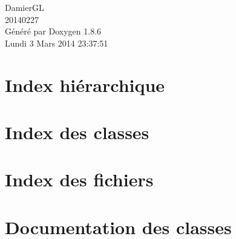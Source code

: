\documentclass[twoside]{book}
\newcommand{\clearemptydoublepage}{%
  \newpage{\pagestyle{empty}\cleardoublepage}%
}
\begin{document}
\hypersetup{pageanchor=false}
\begin{titlepage}
\vspace*{7cm}
\begin{center}%
{\Large Damier\-G\-L \\[1ex]\large 20140227 }\\
\vspace*{1cm}
{\large Généré par Doxygen 1.8.6}\\
\vspace*{0.5cm}
{\small Lundi 3 Mars 2014 23:37:51}\\
\end{center}
\end{titlepage}
\clearemptydoublepage
\tableofcontents
\clearemptydoublepage
{}
\hypersetup{pageanchor=true}

\chapter{Index hiérarchique}

\chapter{Index des classes}

\chapter{Index des fichiers}

\chapter{Documentation des classes}



























\end{document}
